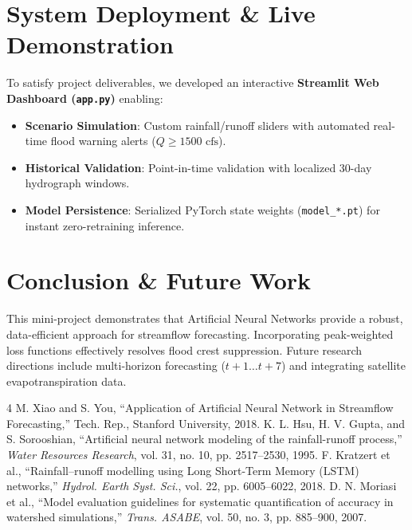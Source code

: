 \documentclass[10pt,twocolumn]{article}
\begin{document}
\section{System Deployment \& Live Demonstration}
To satisfy project deliverables, we developed an interactive \textbf{Streamlit Web Dashboard (\texttt{app.py})} enabling:
\begin{itemize}
    \setlength\itemsep{0em}
    \item \textbf{Scenario Simulation}: Custom rainfall/runoff sliders with automated real-time flood warning alerts ($Q \ge 1500\text{ cfs}$).
    \item \textbf{Historical Validation}: Point-in-time validation with localized 30-day hydrograph windows.
    \item \textbf{Model Persistence}: Serialized PyTorch state weights (\texttt{model\_*.pt}) for instant zero-retraining inference.
\end{itemize}

\section{Conclusion \& Future Work}
This mini-project demonstrates that Artificial Neural Networks provide a robust, data-efficient approach for streamflow forecasting. Incorporating peak-weighted loss functions effectively resolves flood crest suppression. Future research directions include multi-horizon forecasting ($t+1 \dots t+7$) and integrating satellite evapotranspiration data.

\begin{thebibliography}{4}
\small
\setlength\itemsep{0em}
 M. Xiao and S. You, ``Application of Artificial Neural Network in Streamflow Forecasting,'' Tech. Rep., Stanford University, 2018.
 K. L. Hsu, H. V. Gupta, and S. Sorooshian, ``Artificial neural network modeling of the rainfall-runoff process,'' \textit{Water Resources Research}, vol. 31, no. 10, pp. 2517--2530, 1995.
 F. Kratzert et al., ``Rainfall–runoff modelling using Long Short-Term Memory (LSTM) networks,'' \textit{Hydrol. Earth Syst. Sci.}, vol. 22, pp. 6005--6022, 2018.
 D. N. Moriasi et al., ``Model evaluation guidelines for systematic quantification of accuracy in watershed simulations,'' \textit{Trans. ASABE}, vol. 50, no. 3, pp. 885--900, 2007.
\end{thebibliography}
\end{document}

